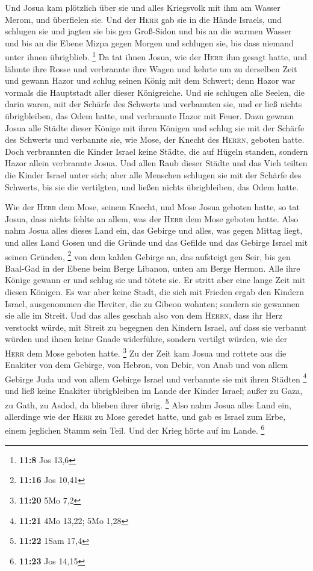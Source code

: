  Und Josua kam plötzlich über sie und alles Kriegsvolk mit
ihm am Wasser Merom, und überfielen sie.  Und der
\textsc{Herr} gab sie in die Hände Israels, und schlugen sie und jagten
sie bis gen Groß-Sidon und bis an die warmen Wasser und bis an die Ebene
Mizpa gegen Morgen und schlugen sie, bis dass niemand unter ihnen
übrigblieb. \footnote{\textbf{11:8} Jos 13,6}  Da tat
ihnen Josua, wie der \textsc{Herr} ihm gesagt hatte, und lähmte ihre
Rosse und verbrannte ihre Wagen  und kehrte um zu
derselben Zeit und gewann Hazor und schlug seinen König mit dem Schwert;
denn Hazor war vormals die Hauptstadt aller dieser Königreiche.
 Und sie schlugen alle Seelen, die darin waren, mit der
Schärfe des Schwerts und verbannten sie, und er ließ nichts
übrigbleiben, das Odem hatte, und verbrannte Hazor mit Feuer.
 Dazu gewann Josua alle Städte dieser Könige mit ihren
Königen und schlug sie mit der Schärfe des Schwerts und verbannte sie,
wie Mose, der Knecht des \textsc{Herrn}, geboten hatte. 
Doch verbrannten die Kinder Israel keine Städte, die auf Hügeln standen,
sondern Hazor allein verbrannte Josua.  Und allen Raub
dieser Städte und das Vieh teilten die Kinder Israel unter sich; aber
alle Menschen schlugen sie mit der Schärfe des Schwerts, bis sie die
vertilgten, und ließen nichts übrigbleiben, das Odem hatte.

 Wie der \textsc{Herr} dem Mose, seinem Knecht, und Mose
Josua geboten hatte, so tat Josua, dass nichts fehlte an allem, was der
\textsc{Herr} dem Mose geboten hatte.  Also nahm Josua
alles dieses Land ein, das Gebirge und alles, was gegen Mittag liegt,
und alles Land Gosen und die Gründe und das Gefilde und das Gebirge
Israel mit seinen Gründen, \footnote{\textbf{11:16} Jos 10,41}
 von dem kahlen Gebirge an, das aufsteigt gen Seir, bis
gen Baal-Gad in der Ebene beim Berge Libanon, unten am Berge Hermon.
Alle ihre Könige gewann er und schlug sie und tötete sie.
 Er stritt aber eine lange Zeit mit diesen Königen.
 Es war aber keine Stadt, die sich mit Frieden ergab den
Kindern Israel, ausgenommen die Heviter, die zu Gibeon wohnten; sondern
sie gewannen sie alle im Streit.  Und das alles geschah
also von dem \textsc{Herrn}, dass ihr Herz verstockt würde, mit Streit
zu begegnen den Kindern Israel, auf dass sie verbannt würden und ihnen
keine Gnade widerführe, sondern vertilgt würden, wie der \textsc{Herr}
dem Mose geboten hatte. \footnote{\textbf{11:20} 5Mo 7,2}
 Zu der Zeit kam Josua und rottete aus die Enakiter von
dem Gebirge, von Hebron, von Debir, von Anab und von allem Gebirge Juda
und von allem Gebirge Israel und verbannte sie mit ihren Städten
\footnote{\textbf{11:21} 4Mo 13,22; 5Mo 1,28}  und ließ
keine Enakiter übrigbleiben im Lande der Kinder Israel; außer zu Gaza,
zu Gath, zu Asdod, da blieben ihrer übrig. \footnote{\textbf{11:22} 1Sam
  17,4}  Also nahm Josua alles Land ein, allerdinge wie
der \textsc{Herr} zu Mose geredet hatte, und gab es Israel zum Erbe,
einem jeglichen Stamm sein Teil. Und der Krieg hörte auf im Lande.
\footnote{\textbf{11:23} Jos 14,15}

